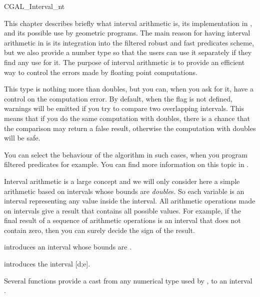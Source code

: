 
\begin{ccClass} {CGAL_Interval_nt}
\label{interval}

This chapter describes briefly what interval arithmetic is, its implementation
in {\cgal}, and its possible use by geometric programs.
The main reason for having interval arithmetic in {\cgal} is its integration
into the filtered robust and fast predicates scheme, but we also provide a
number type so that the users can use it separately if they find any use for
it.  The purpose of interval arithmetic is to provide an efficient way to
control the errors made by floating point computations.

This type is nothing more than doubles, but you can, when you ask for it, have
a control on the computation error.
By default, when the flag  is not defined, warnings
will be emitted if you try to compare two overlapping intervals.  This means
that if you do the same computation with doubles, there is a chance that the
comparison may return a false result, otherwise the computation with doubles
will be safe.

You can select the behaviour of the algorithm in such cases, when you program
filtered predicates for example.  You can find more information on this topic
in \cite{bbp-iayed-98scg}.

\ccDefinition
Interval arithmetic is a large concept and we will only consider here a 
simple arithmetic based on intervals whose bounds are {\it double}s.
So each variable is an interval representing any value inside the interval.
All arithmetic operations made on intervals give a result that contains all
possible values.
For example, if the final result of a sequence of arithmetic operations is
an interval that does not contain zero, then you can surely decide the sign 
of the result.


\ccCreation

 {introduces an interval
whose bounds are .}

{introduces the interval [d;e].}

Several functions  provide a cast from any
numerical type used by {\cgal}, to an interval .



\end{ccClass}
